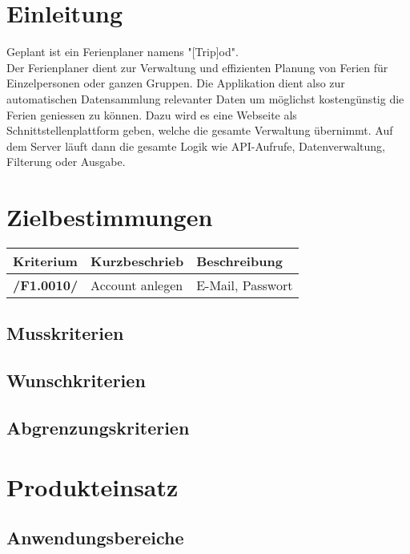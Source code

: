 \documentclass[10pt,a4paper,titlepage,twoside,german]{zhawreprt}
\newcommand{\AddRequirement}[2]{
\textbf{/#1#2/}
}
\newcommand{\F}[1]{
\AddRequirement{F1.}{#1}
}
\begin{document}
\maketitle

\tableofcontents

\chapter{Einleitung}\label{chp:Introduction}
Geplant ist ein Ferienplaner namens "[Trip]od".\\
Der Ferienplaner dient zur Verwaltung und effizienten Planung von Ferien für Einzelpersonen oder ganzen Gruppen. Die Applikation dient also zur automatischen Datensammlung relevanter Daten um möglichst kostengünstig die Ferien geniessen zu können. Dazu wird es eine Webseite als Schnittstellenplattform geben, welche die gesamte Verwaltung übernimmt. Auf dem Server läuft dann die gesamte Logik wie API-Aufrufe, Datenverwaltung, Filterung oder Ausgabe.
\chapter{Zielbestimmungen}\label{chp:DefinitionOfGoals}
\begin{table}
\begin{center}
\begin{tabular}{l|l|l}
Kriterium & Kurzbeschrieb & Beschreibung\\\hline
\F{0010} & Account anlegen & E-Mail, Passwort
\end{tabular}
\end{center}
\end{table}
\section{Musskriterien}\label{sec:MustCriteria}
\section{Wunschkriterien}\label{sec:WishCriteria}
\section{Abgrenzungskriterien}\label{sec:DistinctionCriteria}
\chapter{Produkteinsatz}\label{chp:ProductApplication}
\section{Anwendungsbereiche}\label{sec:FieldOfApplience}
\end{document}
